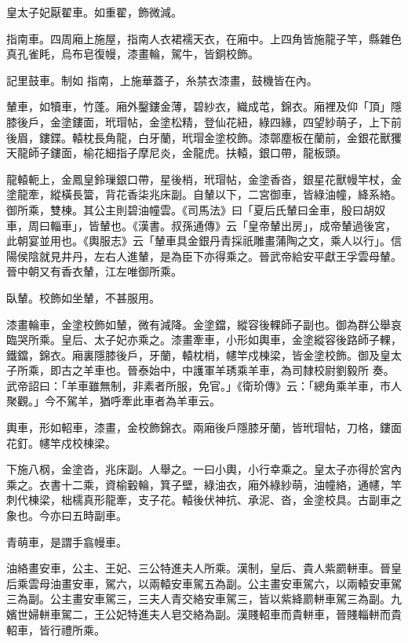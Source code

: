 \begin{pinyinscope}
 皇太子妃厭翟車。如重翟，飾微減。



 指南車。四周廂上施屋，指南人衣裙襦天衣，在廂中。上四角皆施龍子竿，縣雜色真孔雀眊，烏布皂復幔，漆畫輪，駕牛，皆銅校飾。



 記里鼓車。制如
 指南，上施華蓋子，糸禁衣漆畫，鼓機皆在內。



 輦車，如犢車，竹蓬。廂外鑿鏤金薄，碧紗衣，織成芚，錦衣。廂裡及仰「頂」隱膝後戶，金塗鏤面，玳瑁帖，金塗松精，登仙花紐，綠四緣，四望紗萌子，上下前後眉，鏤鍱。轅枕長角龍，白牙蘭，玳瑁金塗校飾。漆鄣塵板在蘭前，金銀花獸玃天龍師子鏤面，榆花細指子摩尼炎，金龍虎。扶轅，銀口帶，龍板頭。



 龍轅軛上，金鳳皇鈴璅銀口帶，星後梢，玳瑁帖，金塗香沓，銀星花獸幔竿杖，金塗龍牽，縱橫長簹，背花香柒兆床副。自輦以下，二宮御車，皆綠油幢，絳系絡。御所乘，雙棟。其公主則碧油幢雲。《司馬法》曰「夏后氏輦曰金車，殷曰胡奴車，周曰輜車」，皆輦也。《漢書。叔孫通傳》云「皇帝輦出房」，成帝輦過後宮，此朝宴並用也。《輿服志》云「輦車具金銀丹青採祇雕畫蒲陶之文，乘人以行」。信陽侯陰就見井丹，左右人進輦，是為臣下亦得乘之。晉武帝給安平獻王孚雲母輦。晉中朝又有香衣輦，江左唯御所乘。



 臥輦。校飾如坐輦，不甚服用。



 漆畫輪車，金塗校飾如輦，微有減降。金塗鐺，縱容後輠師子副也。御為群公舉哀臨哭所乘。皇后、太子妃亦乘之。漆畫牽車，小形如輿車，金塗縱容後路師子輠，鐵鐺，錦衣。廂裏隱膝後戶，牙蘭，轅枕梢，幰竿戍棟梁，皆金塗校飾。御及皇太子所乘，即古之羊車也。晉泰始中，中護軍羊琇乘羊車，為司隸校尉劉毅所
 奏。武帝詔曰：「羊車雖無制，非素者所服，免官。」《衛玠傳》云：「總角乘羊車，市人聚觀。」今不駕羊，猶呼牽此車者為羊車云。



 輿車，形如軺車，漆畫，金校飾錦衣。兩廂後戶隱膝牙蘭，皆玳瑁帖，刀格，鏤面花釘。幰竿戍校棟梁。



 下施八㭎，金塗沓，兆床副。人舉之。一曰小輿，小行幸乘之。皇太子亦得於宮內乘之。衣書十二乘，資榆轂輪，箕子壁，綠油衣，廂外綠紗萌，油幢絡，通幰，竿刺代棟梁，柮檽真形龍牽，支子花。轅後伏神抗、承泥、沓，金塗校具。古副車之象也。今亦曰五時副車。



 青萌車，是謂手翕幔車。



 油絡畫安車，公主、王妃、三公特進夫人所乘。漢制，皇后、貴人紫罽軿車。晉皇后乘雲母油畫安車，駕六，以兩轅安車駕五為副。公主畫安車駕六，以兩轅安車駕三為副。公主畫安車駕三，三夫人青交絡安車駕三，皆以紫絳罽軿車駕三為副。九嬪世婦軿車駕二，王公妃特進夫人皂交絡為副。漢賤軺車而貴軿車，晉賤輜軿而貴
 軺車，皆行禮所乘。




\end{pinyinscope}
